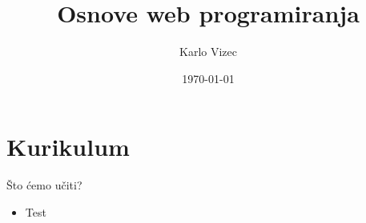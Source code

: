 \documentclass{beamer}
\title{Osnove web programiranja}
\date{\today}
\author{Karlo Vizec}
\institute{V. gimnazija}
\begin{document}
    \maketitle
    \section{Kurikulum}
    \begin{frame}{Što ćemo učiti?}
        \begin{itemize}
            \item Test
        \end{itemize}
    \end{frame}
\end{document}
